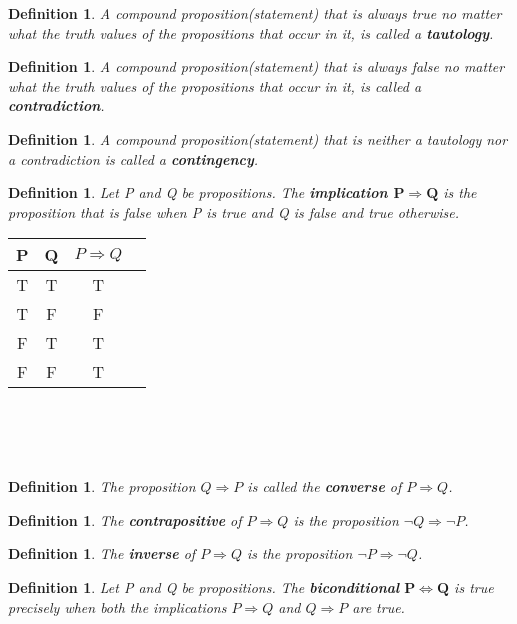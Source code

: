 \documentclass[10pt]{article}
\theoremstyle{plain}
\newtheorem{Def}[Thm]{Definition}
\theoremstyle{definition}
\begin{document}
\begin{Def}
A compound proposition(statement) that is always true no matter what the truth values of the propositions that occur in it, is called a \textbf{tautology}. 
\end{Def}

\begin{Def}
A compound proposition(statement) that is always false no matter what the truth values of the propositions that occur in it, is called a \textbf{contradiction}. 
\end{Def}

\begin{Def}
A compound proposition(statement) that is neither a tautology nor a contradiction is called a \textbf{contingency}. 
\end{Def}

\begin{Def}
Let P and Q be propositions. The \textbf{implication $\boldsymbol{P \Rightarrow Q}$} is the proposition that is false when P is true and Q is false and true otherwise. 
\end{Def}


\begin{tabular}{c|c|c|c}
P & Q & $P \Rightarrow Q$\\
\hline
T & T & T\\
T & F & F\\
F & T & T\\
F & F & T\\

\end{tabular}\\\\\


\begin{Def}
The proposition $Q \Rightarrow P$ is called the \textbf{converse} of $P \Rightarrow Q$. 
\end{Def}

\begin{Def}
The \textbf{contrapositive} of $P \Rightarrow Q$ is the proposition  $\neg Q \Rightarrow \neg P$. 
\end{Def}

\begin{Def}
The \textbf{inverse} of $P \Rightarrow Q$ is the proposition  $\neg P \Rightarrow \neg Q$. 
\end{Def}

\begin{Def}
Let P and Q be propositions. The \textbf{biconditional} $\boldsymbol{P \Leftrightarrow Q}$ is true precisely when both the implications $P \Rightarrow Q$ and $Q \Rightarrow P$ are true. 
\end{Def}
\end{document}
